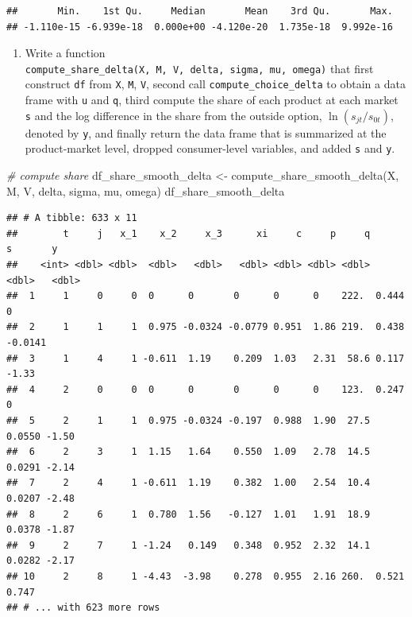 \documentclass[
]{book}
\newenvironment{Shaded}{\begin{snugshade}}{\end{snugshade}}
\newcommand{\CommentTok}[1]{\textcolor[rgb]{0.56,0.35,0.01}{\textit{#1}}}
\newcommand{\FunctionTok}[1]{\textcolor[rgb]{0.00,0.00,0.00}{#1}}
\newcommand{\NormalTok}[1]{#1}
\newcommand{\OtherTok}[1]{\textcolor[rgb]{0.56,0.35,0.01}{#1}}
\providecommand{\tightlist}{%
  \setlength{\itemsep}{0pt}\setlength{\parskip}{0pt}}
\begin{document}
\begin{verbatim}
##       Min.    1st Qu.     Median       Mean    3rd Qu.       Max. 
## -1.110e-15 -6.939e-18  0.000e+00 -4.120e-20  1.735e-18  9.992e-16
\end{verbatim}

\begin{enumerate}
\def\labelenumi{\arabic{enumi}.}
\setcounter{enumi}{6}
\tightlist
\item
  Write a function \texttt{compute\_share\_delta(X,\ M,\ V,\ delta,\ sigma,\ mu,\ omega)} that first construct \texttt{df} from \texttt{X}, \texttt{M}, \texttt{V}, second call \texttt{compute\_choice\_delta} to obtain a data frame with \texttt{u} and \texttt{q}, third compute the share of each product at each market \texttt{s} and the log difference in the share from the outside option, \(\ln(s_{jt}/s_{0t})\), denoted by \texttt{y}, and finally return the data frame that is summarized at the product-market level, dropped consumer-level variables, and added \texttt{s} and \texttt{y}.
\end{enumerate}

\begin{Shaded}
\begin{Highlighting}[]
\CommentTok{\# compute share}
\NormalTok{df\_share\_smooth\_delta }\OtherTok{\textless{}{-}}
  \FunctionTok{compute\_share\_smooth\_delta}\NormalTok{(X, M, V, delta, sigma, mu, omega) }
\NormalTok{df\_share\_smooth\_delta}
\end{Highlighting}
\end{Shaded}

\begin{verbatim}
## # A tibble: 633 x 11
##        t     j   x_1    x_2     x_3      xi     c     p     q      s       y
##    <int> <dbl> <dbl>  <dbl>   <dbl>   <dbl> <dbl> <dbl> <dbl>  <dbl>   <dbl>
##  1     1     0     0  0      0       0      0      0    222.  0.444   0     
##  2     1     1     1  0.975 -0.0324 -0.0779 0.951  1.86 219.  0.438  -0.0141
##  3     1     4     1 -0.611  1.19    0.209  1.03   2.31  58.6 0.117  -1.33  
##  4     2     0     0  0      0       0      0      0    123.  0.247   0     
##  5     2     1     1  0.975 -0.0324 -0.197  0.988  1.90  27.5 0.0550 -1.50  
##  6     2     3     1  1.15   1.64    0.550  1.09   2.78  14.5 0.0291 -2.14  
##  7     2     4     1 -0.611  1.19    0.382  1.00   2.54  10.4 0.0207 -2.48  
##  8     2     6     1  0.780  1.56   -0.127  1.01   1.91  18.9 0.0378 -1.87  
##  9     2     7     1 -1.24   0.149   0.348  0.952  2.32  14.1 0.0282 -2.17  
## 10     2     8     1 -4.43  -3.98    0.278  0.955  2.16 260.  0.521   0.747 
## # ... with 623 more rows
\end{verbatim}
\end{document}
